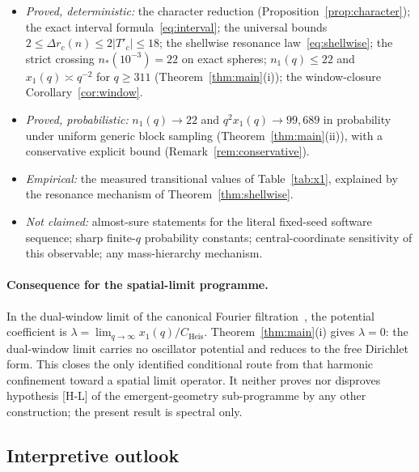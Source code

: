 \documentclass[11pt,a4paper]{article}
\theoremstyle{plain}
\theoremstyle{definition}
\newcommand{\Cheis}{C_{\mathrm{Heis}}}
\newcommand{\xone}{x_1}
\newcommand{\none}{n_1}
\newcommand{\Tp}{T'_c}
\begin{document}
    \begin{itemize}[nosep]
      \item \emph{Proved, deterministic:} the character reduction (Proposition~\ref{prop:character});
        the exact interval formula~\eqref{eq:interval}; the universal bounds
        $2 \le \Delta r_c(n) \le 2\lvert\Tp\rvert \le 18$; the shellwise resonance
        law~\eqref{eq:shellwise}; the strict crossing $n_*(10^{-3}) = 22$ on exact spheres;
        $\none(q) \le 22$ and $\xone(q) \asymp q^{-2}$ for $q \ge 311$
        (Theorem~\ref{thm:main}(i)); the window-closure Corollary~\ref{cor:window}.
      \item \emph{Proved, probabilistic:} $\none(q) \to 22$ and $q^2\xone(q) \to 99{,}689$ in
        probability under uniform generic block sampling (Theorem~\ref{thm:main}(ii)), with a
        conservative explicit bound (Remark~\ref{rem:conservative}).
      \item \emph{Empirical:} the measured transitional values of Table~\ref{tab:x1}, explained by
        the resonance mechanism of Theorem~\ref{thm:shellwise}.
      \item \emph{Not claimed:} almost-sure statements for the literal fixed-seed software
        sequence; sharp finite-$q$ probability constants; central-coordinate sensitivity of this
        observable; any mass-hierarchy mechanism.
    \end{itemize}

    \paragraph{Consequence for the spatial-limit programme.}
      In the dual-window limit of the canonical Fourier filtration~\cite{Beau2026q5a}, the
      potential coefficient is $\lambda = \lim_{q\to\infty} \xone(q)/\Cheis$.
      Theorem~\ref{thm:main}(i) gives $\lambda = 0$: the dual-window limit carries no oscillator
      potential and reduces to the free Dirichlet form.
      This closes the only identified conditional route from that harmonic confinement toward a
      spatial limit operator.
      It neither proves nor disproves hypothesis [H-L] of the emergent-geometry sub-programme by
      any other construction; the present result is spectral only.

    \subsection{Interpretive outlook}
      \label{sec:outlook}
\end{document}
